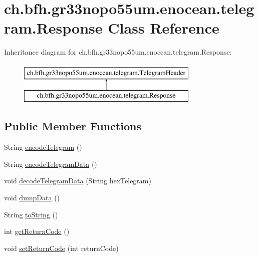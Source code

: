 \hypertarget{classch_1_1bfh_1_1gr33nopo55um_1_1enocean_1_1telegram_1_1_response}{}\section{ch.\+bfh.\+gr33nopo55um.\+enocean.\+telegram.\+Response Class Reference}
\label{classch_1_1bfh_1_1gr33nopo55um_1_1enocean_1_1telegram_1_1_response}
Inheritance diagram for ch.\+bfh.\+gr33nopo55um.\+enocean.\+telegram.\+Response\+:\begin{figure}[H]
\begin{center}
\leavevmode
\includegraphics[height=2.000000cm]{classch_1_1bfh_1_1gr33nopo55um_1_1enocean_1_1telegram_1_1_response}
\end{center}
\end{figure}
\subsection*{Public Member Functions}
\begin{DoxyCompactItemize}
\item 
String \hyperlink{classch_1_1bfh_1_1gr33nopo55um_1_1enocean_1_1telegram_1_1_response_a988abdfe7c98ef8d8dedd603b665a4d8}{encode\+Telegram} ()
\item 
String \hyperlink{classch_1_1bfh_1_1gr33nopo55um_1_1enocean_1_1telegram_1_1_response_ac4f9682e55795ebf981ec273ea09dfd0}{encode\+Telegram\+Data} ()
\item 
void \hyperlink{classch_1_1bfh_1_1gr33nopo55um_1_1enocean_1_1telegram_1_1_response_ad39af2286654f5e0892ff9abe01eb1e2}{decode\+Telegram\+Data} (String hex\+Telegram)
\item 
void \hyperlink{classch_1_1bfh_1_1gr33nopo55um_1_1enocean_1_1telegram_1_1_response_ad20303a12d6ff415c78a853b2eda2526}{dump\+Data} ()
\item 
String \hyperlink{classch_1_1bfh_1_1gr33nopo55um_1_1enocean_1_1telegram_1_1_response_a7e5e88df8312bf7a07f665670ff2fad1}{to\+String} ()
\item 
int \hyperlink{classch_1_1bfh_1_1gr33nopo55um_1_1enocean_1_1telegram_1_1_response_a3d0ad42e8295de5a7d862f9dc798f853}{get\+Return\+Code} ()
\item 
void \hyperlink{classch_1_1bfh_1_1gr33nopo55um_1_1enocean_1_1telegram_1_1_response_af89c0749d63b470e612d74596a210486}{set\+Return\+Code} (int return\+Code)
\end{DoxyCompactItemize}


